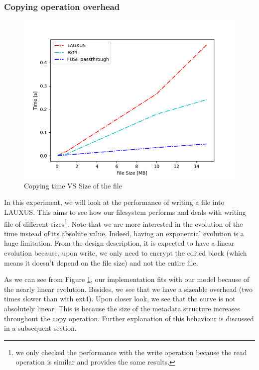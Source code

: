 \documentclass[../main.tex]{subfiles}
\begin{document}
\subsubsection{Copying operation overhead}
\label{section:analysis:write_overhead}
\begin{figure}[h]
    \centering
    \includegraphics[width=.8\textwidth]{images/analysis/per_size}
    
    \caption{Copying time VS Size of the file}
    \label{figure:analysis:perf_write_per_size}
\end{figure}
\par In this experiment, we will look at the performance of writing a file into LAUXUS. This aims to see how our filesystem performs and deals with writing file of different sizes\footnote{we only checked the performance with the write operation because the read operation is similar and provides the same results.}. Note that we are more interested in the evolution of the time instead of its absolute value. Indeed, having an exponential evolution is a huge limitation. From the design description, it is expected to have a linear evolution because, upon write, we only need to encrypt the edited block (which means it doesn't depend on the file size) and not the entire file.
\par As we can see from Figure \ref{figure:analysis:perf_write_per_size}, our implementation fits with our model because of the nearly linear evolution. Besides, we see that we have a sizeable overhead (two times slower than with ext4). Upon closer look, we see that the curve is not absolutely linear. This is because the size of the metadata structure increases throughout the copy operation. Further explanation of this behaviour is discussed in a subsequent section.
\end{document}
